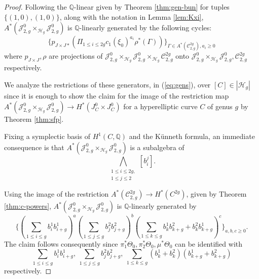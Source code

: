 \documentclass[11pt]{amsart}
\theoremstyle{definition}
\newcommand{\ri}{\rightarrow}
\newcommand{\jac}{\mathcal{J}}
\newcommand{\h}{\mathcal{H}}
\newcommand{\Q}{\mathbb{Q}}
\newcommand{\mC}{\mathcal{C}}
\newcommand{\T}{\Theta}
\begin{document}
\begin{proof} 
Following the $\Q$-linear given by Theorem \ref{thm:gen-bun}
for tuples $\{(1,0),(1,0)\}$, along with the notation in Lemma \ref{lem:Kxi}, $A^*(\jac^0_{2,g}\times_{\h_g}\jac^{0}_{2,g})$ is $\Q$-linearly generated by the following cycles:
\begin{equation}\label{eq:gens}\big \{p_{J\times J *}\left(\Pi_{1\leq i\leq 2g}c_1(\xi_0)^{a_i}\rho^*(\Gamma)\right)\big \}_{\Gamma\in A^*(\mC_{2,g}^{2g}), a_i\geq 0}\end{equation}
where $p_{J\times J}, \rho$ are projections of $\jac^0_{2,g}\times_{\h_g}\jac^{0}_{2,g}\times_{\h_g}\mC_{2,g}^{2g}$ onto $ \jac^0_{2,g}\times_{\h_g}\jac^{0}_{2,g},\mC_{2,g}^{2g}$ respectively.

We analyze the restrictions of these generators, in (\ref{eq:gens}), over $[C]\in |\h_g|$ since it is enough to show the claim for the image of the restriction map $A^*(\jac^0_{2,g}\times_{\h_g}\jac^{0}_{2,g})\ri H^*(J^0_C\times J^0_C)$ for a hyperelliptic curve $C$ of genus $g$  by Theorem \ref{thm:sfp}. 

Fixing a symplectic basis of $H^1(C,\Q)$ and the K\"unneth formula, an immediate consequence is that $A^*(\jac^0_{2,g}\times_{\h_g}\jac^{0}_{2,g})$ is a subalgebra of 
$$\bigwedge_{\substack{1\leq i\leq 2g,\\1\leq j\leq 2}} [b^j_i].$$

Using the image of the restriction $A^*(\mC_{2,g}^{2g}) \ri H^*(C^{2g})$, given by Theorem \ref{thm:c-powers}, 
$A^*(\jac^0_{2,g}\times_{\h_g}\jac^{0}_{2,g})$ is $\Q$-linearly generated by
$$\{(\sum_{1\leq i\leq g} b^1_ib^1_{i+g})^a(\sum_{1\leq j\leq g} b^2_jb^2_{j+g})^b(\sum_{1\leq k\leq g} b^1_kb^2_{k+g}+b^2_kb^1_{k+g})^c\}_{a,b,c\geq 0}.$$
The claim follows consequently since $\pi_1^*\T_0,\pi_2^*\T_0,\mu^*\T_0$ can be identified with 
$$\sum_{1\leq i\leq g} b^1_ib^1_{i+g}, \ \sum_{1\leq j\leq g} b^2_jb^2_{j+g}, \  \sum_{1\leq k\leq g} (b^1_k+b^2_k)(b^1_{k+g}+b^2_{k+g})$$ respectively.
\end{proof}
\end{document}

